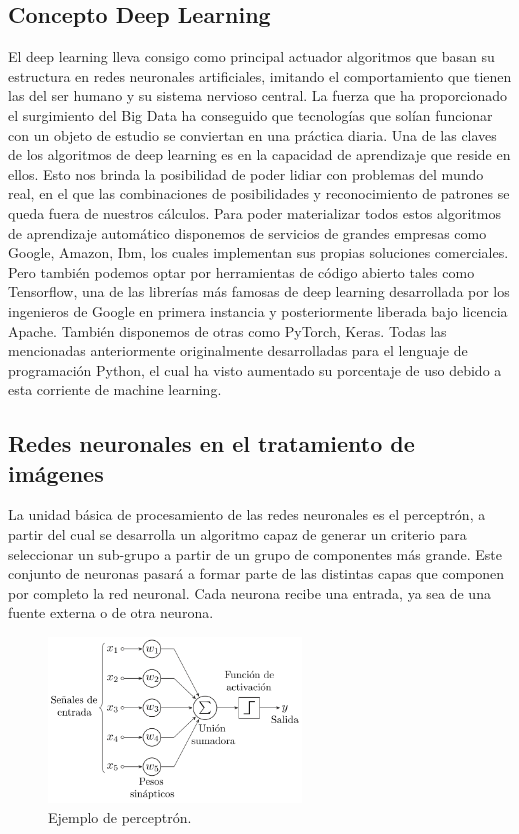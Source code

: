 \subsection{Concepto Deep Learning}\label{subsec:concepto-deep-learning}
El deep learning lleva consigo como principal actuador algoritmos que basan su estructura en redes neuronales artificiales, imitando el comportamiento que tienen las del ser humano y su sistema nervioso central.
La fuerza que ha proporcionado el surgimiento del Big Data ha conseguido que tecnologías que solían funcionar con un objeto de estudio se conviertan en una práctica
diaria.
Una de las claves de los algoritmos de deep learning es en la capacidad de aprendizaje que reside en ellos.
Esto nos brinda la posibilidad de poder lidiar con problemas del mundo real,
en el que las combinaciones de posibilidades y reconocimiento de patrones se queda fuera de nuestros cálculos.
Para poder materializar todos estos algoritmos de aprendizaje automático disponemos de servicios de grandes empresas como Google, Amazon, Ibm, los cuales
implementan sus propias soluciones comerciales.
Pero también podemos optar por herramientas de código abierto tales como Tensorflow, una de las librerías más famosas de deep learning desarrollada por los ingenieros de Google en primera instancia y posteriormente liberada bajo licencia Apache.
También disponemos de otras como PyTorch, Keras.
Todas las mencionadas anteriormente originalmente desarrolladas para el lenguaje de programación Python, el cual ha visto aumentado su porcentaje de uso debido a esta corriente de
machine learning.


\subsection{Redes neuronales en el tratamiento de imágenes}\label{subsec:redes-neuronales-en-el-tratamiento-de-imágenes}
La unidad básica de procesamiento de las redes neuronales es el perceptrón, a partir del cual se desarrolla un algoritmo capaz de generar un criterio para seleccionar un sub-grupo a partir de un grupo de componentes más grande.
Este conjunto de neuronas pasará a formar parte de las distintas capas que componen por completo la red neuronal.
Cada neurona recibe una entrada, ya sea de una fuente externa o de otra neurona.

\begin{figure}
    \centering
    \includegraphics[width=0.6\textwidth]{images/chapter1/perceptron.png}
    \caption{Ejemplo de perceptrón.}
    \label{fig:Perceptrón}
\end{figure}

